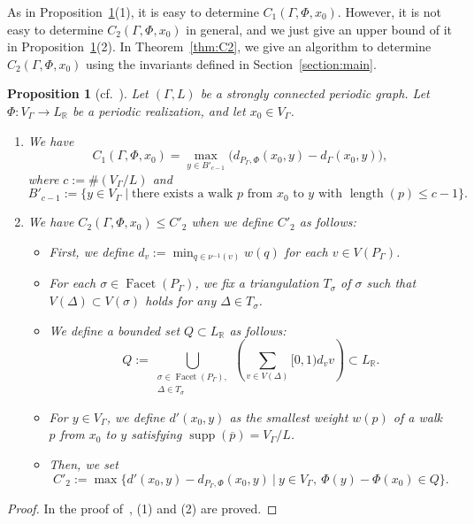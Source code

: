 \documentclass[11pt]{article}
\newtheorem{prop}[theo]{Proposition}
\theoremstyle{definition}
\numberwithin{equation}{section}
\begin{document}
\begin{rmk}
As in Proposition~\ref{prop:C2}(1), it is easy to determine $C_{1}(\Gamma, \Phi, x_0)$. 
However, it is not easy to determine $C_{2}(\Gamma, \Phi, x_0)$ in general, and we just give an upper bound of it in Proposition~\ref{prop:C2}(2). 
In Theorem~\ref{thm:C2}, we give an algorithm to determine $C_{2}(\Gamma, \Phi, x_0)$ using the invariants defined in Section~\ref{section:main}. 
\end{rmk}

\begin{prop}[{cf.\ \cite[Theorem A.2]{IN}}]\label{prop:C2}
Let $(\Gamma , L)$ be a strongly connected periodic graph. 
Let $\Phi : V_{\Gamma} \to L_{\mathbb{R}}$ be a periodic realization, and let $x_0 \in V_{\Gamma}$. 
\begin{enumerate}
\item 
We have 
\[
C_{1}(\Gamma, \Phi, x_0) = 
\max _{y \in B'_{c-1}} \bigl( d_{P_{\Gamma}, \Phi} (x_0, y) - d_{\Gamma} (x_0, y) \bigr), 
\]
where $c := \# (V_{\Gamma} /L)$ and 
\[
B'_{c-1} := \{ y \in V_{\Gamma} \mid \text{there exists a walk $p$ from $x_0$ to $y$ with $\operatorname{length}(p) \le c-1$}\}. 
\]


\item 
We have $C_{2}(\Gamma, \Phi, x_0) \le C'_2$ when we define $C'_2$ as follows: 
\begin{itemize}
\item 
First, we define $d_v := \min _{q \in \nu ^{-1}(v)} w(q)$ for each $v \in V(P_{\Gamma})$. 

\item
For each $\sigma \in \operatorname{Facet}(P_{\Gamma})$, we fix a triangulation $T_{\sigma}$ of $\sigma$ such that $V(\Delta) \subset V(\sigma)$ holds for any $\Delta \in T_{\sigma}$. 

\item
We define a bounded set $Q \subset L_{\mathbb{R}}$ as follows: 
\[
Q := 
\bigcup _{\substack{\sigma \in \operatorname{Facet}(P_{\Gamma}),\\ 
\Delta \in T_{\sigma}}}
\left( \sum _{v \in V(\Delta)}  [0,1) d_v v \right)
\subset L_{\mathbb{R}}. 
\]

\item
For $y \in V_{\Gamma}$, we define $d'(x_0, y)$ as the smallest weight $w(p)$ of 
a walk $p$ from $x_0$ to $y$ satisfying $\operatorname{supp}(\overline{p}) = V_{\Gamma} /L$. 

\item
Then, we set
\[
C' _2 := \max \bigl \{ d'(x_0, y) - d_{P_{\Gamma}, \Phi} ( x_0, y ) \ \big | \ 
y \in V_{\Gamma}, \ \Phi(y) - \Phi(x_0) \in Q \bigr \}. 
\]
\end{itemize}

\end{enumerate}
\end{prop}
\begin{proof}
In the proof of~\cite[Theorem A.2]{IN}, (1) and (2) are proved. 
\end{proof}
\end{document}
